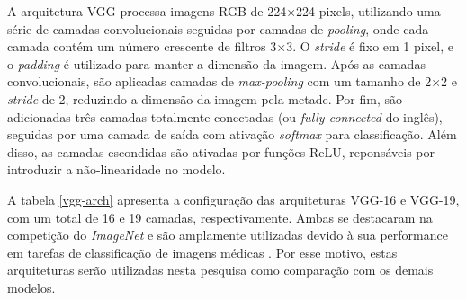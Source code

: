 A arquitetura VGG processa imagens RGB de 224×224 pixels, utilizando uma série de camadas convolucionais seguidas por camadas de \textit{pooling}, onde cada camada contém um número crescente de filtros 3×3. O \textit{stride} é fixo em 1 pixel, e o \textit{padding} é utilizado para manter a dimensão da imagem. Após as camadas convolucionais, são aplicadas camadas de \textit{max-pooling} com um tamanho de 2×2 e \textit{stride} de 2, reduzindo a dimensão da imagem pela metade. Por fim, são adicionadas três camadas totalmente conectadas (ou \textit{fully connected} do inglês), seguidas por uma camada de saída com ativação \textit{softmax} para classificação. Além disso, as camadas escondidas são ativadas por funções ReLU, reponsáveis por introduzir a não-linearidade no modelo.

A tabela \ref{vgg-arch} apresenta a configuração das arquiteturas VGG-16 e VGG-19, com um total de 16 e 19 camadas, respectivamente. Ambas se destacaram na competição do \textit{ImageNet} e são amplamente utilizadas devido à sua performance em tarefas de classificação de imagens médicas \citep{Saini2023, Sitaula2021}. Por esse motivo, estas arquiteturas serão utilizadas nesta pesquisa como comparação com os demais modelos.


